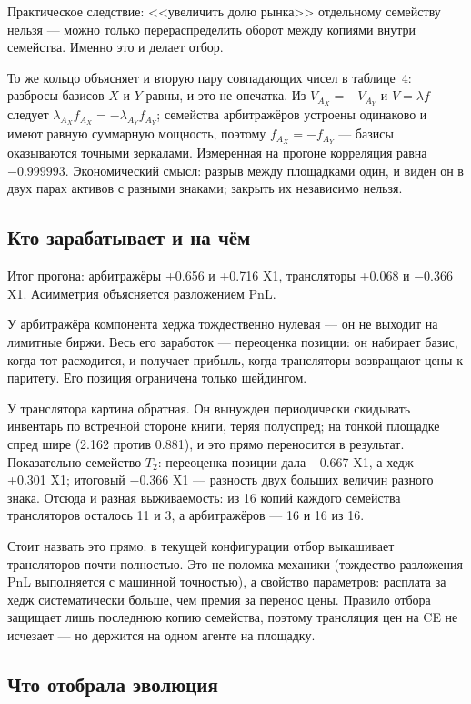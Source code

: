 \documentclass[11pt,a4paper]{article}
\begin{document}
Практическое следствие: <<увеличить долю рынка>> отдельному семейству
нельзя --- можно только перераспределить оборот между копиями внутри
семейства. Именно это и делает отбор.

То же кольцо объясняет и вторую пару совпадающих чисел в таблице~4:
разбросы базисов \(X\) и \(Y\) равны, и это не опечатка. Из
\(V_{A_X} = -V_{A_Y}\) и \(V = \lambda f\) следует
\(\lambda_{A_X} f_{A_X} = -\lambda_{A_Y} f_{A_Y}\); семейства арбитражёров
устроены одинаково и имеют равную суммарную мощность, поэтому
\(f_{A_X} = -f_{A_Y}\) --- базисы оказываются точными зеркалами. Измеренная
на прогоне корреляция равна \(-0.999993\). Экономический смысл: разрыв
между площадками один, и виден он в двух парах активов с разными знаками;
закрыть их независимо нельзя.

\subsection{Кто зарабатывает и на чём}

Итог прогона: арбитражёры +0.656 и +0.716 X1, трансляторы +0.068 и
−0.366 X1. Асимметрия объясняется разложением PnL.

У арбитражёра компонента хеджа тождественно нулевая --- он не выходит на
лимитные биржи. Весь его заработок --- переоценка позиции: он набирает
базис, когда тот расходится, и получает прибыль, когда трансляторы
возвращают цены к паритету. Его позиция ограничена только шейдингом.

У транслятора картина обратная. Он вынужден периодически скидывать
инвентарь по встречной стороне книги, теряя полуспред; на тонкой площадке
спред шире (2.162 против 0.881), и это прямо переносится в результат.
Показательно семейство \(T_2\): переоценка позиции дала −0.667 X1, а
хедж --- +0.301 X1; итоговый −0.366 X1 --- разность двух больших
величин разного знака. Отсюда и разная выживаемость: из 16 копий каждого
семейства трансляторов осталось 11 и 3, а арбитражёров ---
16 и 16 из 16.

Стоит назвать это прямо: в текущей конфигурации отбор выкашивает
трансляторов почти полностью. Это не поломка механики (тождество разложения
PnL выполняется с машинной точностью), а свойство параметров: расплата за
хедж систематически больше, чем премия за перенос цены. Правило отбора
защищает лишь последнюю копию семейства, поэтому трансляция цен на CE
не исчезает --- но держится на одном агенте на площадку.

\subsection{Что отобрала эволюция}
\end{document}
